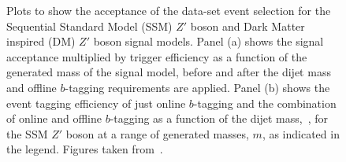 \begin{figure}[!htb]
  \begin{center}
    \captionsetup[subfigure]{aboveskip=0pt,justification=centering}
  \end{center}
  \vspace{-1em}
  \caption[Plots to show the acceptance of the \lm{} data-set event selection for the
    Sequential Standard Model (SSM) $Z'$ boson and Dark Matter inspired (DM) $Z'$ boson signal models.]
          {Plots to show the acceptance of the \lm{} data-set event selection for the
            Sequential Standard Model (SSM) $Z'$ boson and Dark Matter inspired (DM) $Z'$ boson signal models.
            Panel (a) shows the signal acceptance multiplied by trigger efficiency as a
            function of the generated mass of the signal model, before and after the
            dijet mass and offline $b$-tagging requirements are applied.
            Panel (b) shows the event tagging efficiency of just online $b$-tagging and the combination of online and offline $b$-tagging
            as a function of the dijet mass,~\mjj, for the SSM $Z'$ boson 
            at a range of generated masses, $m$, as indicated in the legend.
            Figures taken from~\cite{dibjet-full_int}.} 
  \label{fig:evt-lm_acc}
\end{figure}


